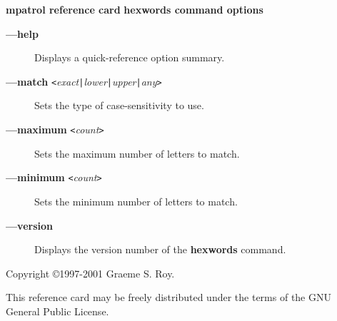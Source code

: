 \documentclass[a4paper,landscape,final]{article}
\newcommand{\heading}[1]{\textbf{\normalsize #1}}
\newcommand{\command}[1]{\textbf{#1}}
\newcommand{\flag}[1]{\textbf{---#1}}
\newcommand{\flagpar}[2]{\flag{#1} \texttt{<}\textit{#2}\texttt{>}}
\begin{document}
\begin{multicols}{3}{\textbf{\Large mpatrol reference card}}
\vskip 12pt
\heading{hexwords command options}
\vskip 6pt

\begin{description}
\item[\flag{help}]
Displays a quick-reference option summary.
\item[\flagpar{match}{exact\texttt{|}lower\texttt{|}upper\texttt{|}any}]
Sets the type of case-sensitivity to use.
\item[\flagpar{maximum}{count}]
Sets the maximum number of letters to match.
\item[\flagpar{minimum}{count}]
Sets the minimum number of letters to match.
\item[\flag{version}]
Displays the version number of the \command{hexwords} command.
\end{description}

\vskip 12pt
Copyright \copyright 1997-2001 Graeme S. Roy.
\vskip 6pt

This reference card may be freely distributed under the terms of the GNU General
Public License.

\end{multicols}
\end{document}
